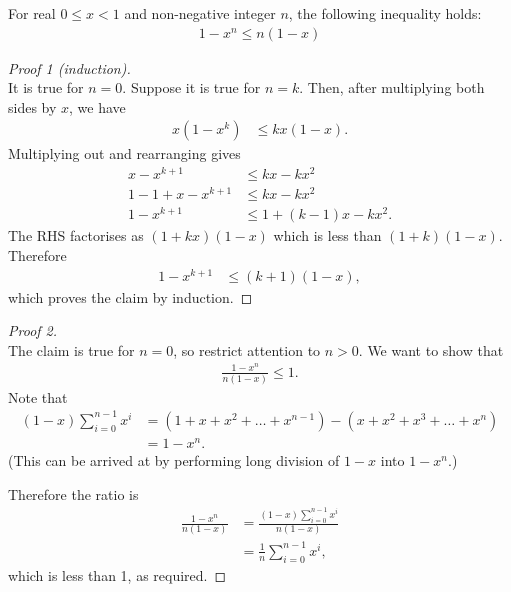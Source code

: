 \begin{claim*}
  For real $0 \leq x < 1$ and non-negative integer $n$, the following inequality holds:
  \begin{align*}
    1 - x^n \leq n(1 - x)
  \end{align*}
\end{claim*}

\begin{proof}[Proof 1 (induction)]~\\
  It is true for $n=0$. Suppose it is true for $n=k$. Then, after multiplying
  both sides by $x$, we have
  \begin{align*}
    x(1 - x^k)  &\leq kx(1 - x).
  \end{align*}
  Multiplying out and rearranging gives
  \begin{align*}
    x - x^{k+1}         &\leq kx - kx^2\\
    1 - 1 + x - x^{k+1} &\leq kx - kx^2\\
    1 - x^{k+1}         &\leq 1 + (k - 1)x - kx^2.
  \end{align*}
  The RHS factorises as $(1 + kx)(1 - x)$ which is less than
  $(1+k)(1-x)$. Therefore
   \begin{align*}
     1 - x^{k+1} &\leq (k + 1)(1 - x),
  \end{align*}
  which proves the claim by induction.
\end{proof}

\begin{proof}[Proof 2]~\\
  The claim is true for $n=0$, so restrict attention to $n > 0$. We want to show that
  \begin{align*}
    \frac{1 - x^n}{n(1 - x)} \leq 1.
  \end{align*}
  Note that
  \begin{align*}
    (1 - x)\sum_{i=0}^{n-1}x^i &= (1 + x + x^2 + \ldots + x^{n-1}) - (x + x^2 + x^3 + \ldots + x^n)\\
                              &= 1 - x^n.
  \end{align*}
  (This can be arrived at by performing long division of $1-x$ into $1 - x^n$.)

  Therefore the ratio is
  \begin{align*}
    \frac{1 - x^n}{n(1 - x)} &= \frac{(1 - x)\sum_{i=0}^{n-1}x^i}{n(1 - x)}\\
                             &= \frac{1}{n}\sum_{i=0}^{n-1}x^i,
  \end{align*}
  which is less than 1, as required.

\end{proof}
